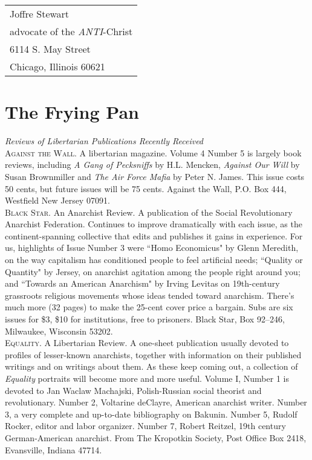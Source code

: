 \documentclass[12pt, onecolumn, letterpaper, oneside]{book}
\begin{document}
\par\begin{flushright}
\begin{tabular}{l}
Joffre Stewart\\advocate of the \emph{ANTI}-Christ\\6114 S. May Street\\Chicago, Illinois 60621 
\end{tabular} 
\end{flushright}


\chapter{The Frying Pan}
\vspace{-1cm}
\emph{Reviews of Libertarian Publications Recently Received}\\

\noindent\textsc{Against the Wall.} A libertarian magazine. Volume 4 Number 5 is largely book reviews, including \emph{A Gang of Pecksniffs} by H.L. Mencken, \emph{Against Our Will} by Susan Brownmiller and \emph{The Air Force Mafia} by Peter N. James. This issue costs 50 cents, but future issues will be 75 cents. Against the Wall, P.O. Box 444, Westfield New Jersey 07091.\\

\noindent\textsc{Black Star.} An Anarchist Review. A publication of the Social Revolutionary Anarchist Federation. Continues to improve dramatically with each issue, as the continent-spanning collective that edits and publishes it gains in experience. For us, highlights of Issue Number 3 were ``Homo Economicus" by Glenn Meredith, on the way capitalism has conditioned people to feel artificial needs; ``Quality or Quantity" by Jersey, on anarchist agitation among the people right around you; and ``Towards an American Anarchism" by Irving Levitas on 19th-century grassroots religious movements whose ideas tended toward anarchism. There's much more (32 pages) to make the 25-cent cover price a bargain. Subs are six issues for \$3, \$10 for institutions, free to prisoners. Black Star, Box 92--246, Milwaukee, Wisconsin 53202.\\

\noindent\textsc{Equality.} A Libertarian Review. A one-sheet publication usually devoted to profiles of lesser-known anarchists, together with information on their published writings and on writings about them. As these keep coming out, a collection of \emph{Equality} portraits will become more and more useful. Volume I, Number 1 is devoted to Jan Waclaw Machajski, Polish-Russian social theorist and revolutionary. Number 2, Voltarine deClayre, American anarchist writer. Number 3, a very complete and up-to-date bibliography on Bakunin. Number 5, Rudolf Rocker, editor and labor organizer. Number 7, Robert Reitzel, 19th century German-American anarchist. From The Kropotkin Society, Post Office Box 2418, Evansville, Indiana 47714.\\
\end{document}
